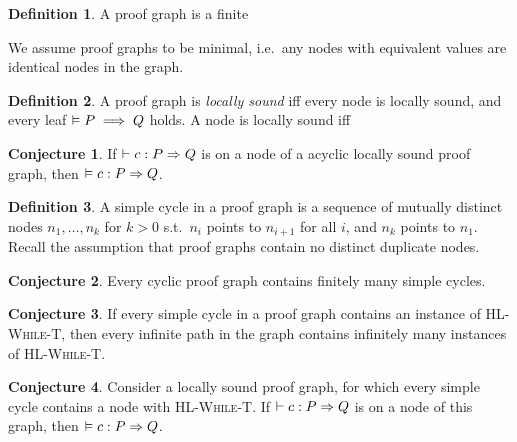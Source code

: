 \documentclass[10pt]{article}
\theoremstyle{definition}
\newtheorem{definition}{Definition}
\newtheorem{conjecture}{Conjecture}
\begin{document}
\begin{definition}
    A proof graph is a finite 

    We assume proof graphs to be minimal, i.e.\ any nodes with equivalent values
    are identical nodes in the graph.
\end{definition}

\begin{definition}
    A proof graph is \emph{locally sound} iff every node is locally sound,
    and every leaf $\vDash P \implies Q$ holds.
    A node is locally sound iff 
\end{definition}

\begin{conjecture}
    If $\DER \Triple c : P => Q$ is on a node of a
    acyclic locally sound proof graph,
    then $\VAL \Triple c : P => Q$.
\end{conjecture}

\begin{definition}
    A simple cycle in a proof graph is a sequence of mutually distinct nodes $n_1,\dots,n_k$ for $k > 0$
    s.t.\ $n_i$ points to $n_{i+1}$ for all $i$, and $n_k$ points to $n_1$.
    Recall the assumption that proof graphs contain no distinct duplicate nodes.
\end{definition}

\begin{conjecture}
    Every cyclic proof graph contains finitely many simple cycles.
\end{conjecture}


\begin{conjecture}
    If every simple cycle in a proof graph
    contains an instance of \textsc{HL-While-T},
    then every infinite path in the graph
    contains infinitely many instances of \textsc{HL-While-T}.
\end{conjecture}

\begin{conjecture}
    Consider a locally sound proof graph,
    for which every simple cycle contains a node
    with \textsc{HL-While-T}.
    If $\DER \Triple c : P => Q$ is on a node of this graph,
    then $\VAL \Triple c : P => Q$.
\end{conjecture}
\end{document}
